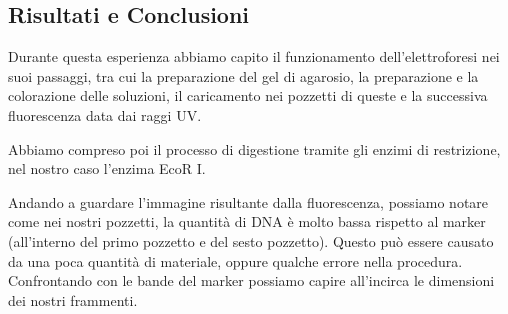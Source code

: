 \subsection{Risultati e Conclusioni}

Durante questa esperienza abbiamo capito il funzionamento dell'elettroforesi nei suoi passaggi,
tra cui la preparazione del gel di agarosio, la preparazione e la colorazione delle soluzioni,
il caricamento nei pozzetti di queste e la successiva fluorescenza data dai raggi UV.

Abbiamo compreso poi il processo di digestione tramite gli enzimi di restrizione,
nel nostro caso l'enzima EcoR I.

Andando a guardare l'immagine risultante dalla fluorescenza,
possiamo notare come nei nostri pozzetti,
la quantità di DNA è molto bassa rispetto al
marker (all'interno del primo pozzetto e del sesto pozzetto).
Questo può essere causato da una poca quantità di materiale, oppure qualche errore nella procedura.
Confrontando con le bande del marker possiamo capire all'incirca le dimensioni dei nostri frammenti.
